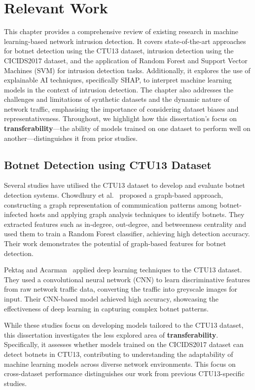 \chapter{Relevant Work}\label{chap:relevant-work}

This chapter provides a comprehensive review of existing research in machine learning-based network intrusion detection. It covers state-of-the-art approaches for botnet detection using the CTU13 dataset, intrusion detection using the CICIDS2017 dataset, and the application of Random Forest and Support Vector Machines (SVM) for intrusion detection tasks. Additionally, it explores the use of explainable AI techniques, specifically SHAP, to interpret machine learning models in the context of intrusion detection. The chapter also addresses the challenges and limitations of synthetic datasets and the dynamic nature of network traffic, emphasising the importance of considering dataset biases and representativeness. Throughout, we highlight how this dissertation’s focus on \textbf{transferability}—the ability of models trained on one dataset to perform well on another—distinguishes it from prior studies.

\section{Botnet Detection using CTU13 Dataset}

Several studies have utilised the CTU13 dataset to develop and evaluate botnet detection systems. Chowdhury et al.~\cite{chowdhury2017botnet} proposed a graph-based approach, constructing a graph representation of communication patterns among botnet-infected hosts and applying graph analysis techniques to identify botnets. They extracted features such as in-degree, out-degree, and betweenness centrality and used them to train a Random Forest classifier, achieving high detection accuracy. Their work demonstrates the potential of graph-based features for botnet detection.

Pektaş and Acarman~\cite{pektacs2019deep} applied deep learning techniques to the CTU13 dataset. They used a convolutional neural network (CNN) to learn discriminative features from raw network traffic data, converting the traffic into greyscale images for input. Their CNN-based model achieved high accuracy, showcasing the effectiveness of deep learning in capturing complex botnet patterns.

While these studies focus on developing models tailored to the CTU13 dataset, this dissertation investigates the less explored area of \textbf{transferability}. Specifically, it assesses whether models trained on the CICIDS2017 dataset can detect botnets in CTU13, contributing to understanding the adaptability of machine learning models across diverse network environments. This focus on cross-dataset performance distinguishes our work from previous CTU13-specific studies.

